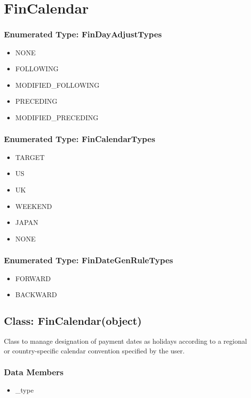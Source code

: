 \documentclass[twoside,11pt]{book}
\begin{document}
\newpage
\section{FinCalendar}

\subsubsection{Enumerated Type: FinDayAdjustTypes}
\begin{itemize}
\item{NONE}
\item{FOLLOWING}
\item{MODIFIED\_FOLLOWING}
\item{PRECEDING}
\item{MODIFIED\_PRECEDING}
\end{itemize}

\subsubsection{Enumerated Type: FinCalendarTypes}
\begin{itemize}
\item{TARGET}
\item{US}
\item{UK}
\item{WEEKEND}
\item{JAPAN}
\item{NONE}
\end{itemize}

\subsubsection{Enumerated Type: FinDateGenRuleTypes}
\begin{itemize}
\item{FORWARD}
\item{BACKWARD}
\end{itemize}

\subsection*{Class: FinCalendar(object)}
Class to manage designation of payment dates as holidays according to a regional or country-specific calendar convention specified by the user.  

\subsubsection*{Data Members}
\begin{itemize}
\item{\_type}
\end{itemize}
\end{document}
